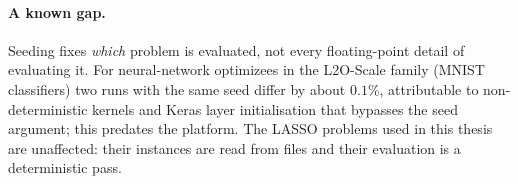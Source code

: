 \paragraph{A known gap.}
Seeding fixes \emph{which} problem is evaluated, not every floating-point
detail of evaluating it. For neural-network optimizees in the L2O-Scale family
(MNIST classifiers) two runs with the same seed differ by about $0.1\%$,
attributable to non-deterministic kernels and Keras layer initialisation that
bypasses the seed argument; this predates the platform. The LASSO problems used
in this thesis are unaffected: their instances are read from files and their
evaluation is a deterministic pass.
